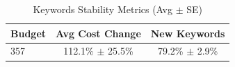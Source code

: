 \begin{table}[htbp]
\centering
\caption{Keywords Stability Metrics (Avg $\pm$ SE)}
\begin{tabular}{lcc}
\toprule
Budget & Avg Cost Change & New Keywords \\
\midrule
357 & 112.1\% $\pm$ 25.5\% & 79.2\% $\pm$ 2.9\% \\
\bottomrule
\end{tabular}
\end{table}